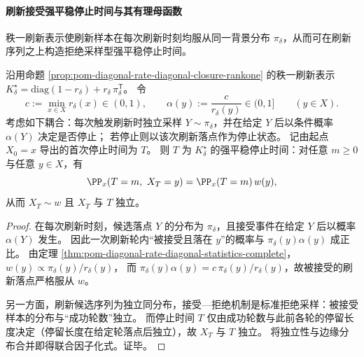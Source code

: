 \paragraph{刷新接受强平稳停止时间与其有理母函数}
秩一刷新表示使刷新样本在每次刷新时刻均服从同一背景分布 \(\pi_\delta\)，从而可在刷新序列之上构造拒绝采样型强平稳停止时间。

\begin{theorem}[刷新接受强平稳停止时间]\label{thm:pom-diagonal-rate-refresh-accept-strong-stationary-time}
沿用命题 \ref{prop:pom-diagonal-rate-diagonal-closure-rankone} 的秩一刷新表示
\(
K^\star_\delta=\mathrm{diag}(1-r_\delta)+r_\delta\,\pi_\delta^{\mathsf T}
\)。
令
\[
c:=\min_{x\in X}r_\delta(x)\in(0,1),
\qquad
\alpha(y):=\frac{c}{r_\delta(y)}\in(0,1]\qquad(y\in X).
\]
考虑如下耦合：每次触发刷新时独立采样 \(Y\sim\pi_\delta\)，并在给定 \(Y\) 后以条件概率 \(\alpha(Y)\) 决定是否停止；
若停止则以该次刷新落点作为停止状态。
记由起点 \(X_0=x\) 导出的首次停止时间为 \(T\)。
则 \(T\) 为 \(K^\star_\delta\) 的强平稳停止时间：对任意 \(m\ge 0\) 与任意 \(y\in X\)，有
\[
\PP_x(T=m,\ X_T=y)=\PP_x(T=m)\,w(y),
\]
从而 \(X_T\sim w\) 且 \(X_T\) 与 \(T\) 独立。
\end{theorem}
\begin{proof}
在每次刷新时刻，候选落点 \(Y\) 的分布为 \(\pi_\delta\)，且接受事件在给定 \(Y\) 后以概率 \(\alpha(Y)\) 发生。
因此一次刷新轮内“被接受且落在 \(y\)”的概率与 \(\pi_\delta(y)\alpha(y)\) 成正比。
由定理 \ref{thm:pom-diagonal-rate-diagonal-statistics-complete}，
\(
w(y)\propto \pi_\delta(y)/r_\delta(y)
\)，
而 \(\pi_\delta(y)\alpha(y)=c\,\pi_\delta(y)/r_\delta(y)\)，故被接受的刷新落点严格服从 \(w\)。
\par
另一方面，刷新候选序列为独立同分布，接受—拒绝机制是标准拒绝采样：被接受样本的分布与“成功轮数”独立。
而停止时间 \(T\) 仅由成功轮数与此前各轮的停留长度决定（停留长度在给定轮落点后独立），故 \(X_T\) 与 \(T\) 独立。
将独立性与边缘分布合并即得联合因子化式。证毕。
\end{proof}


